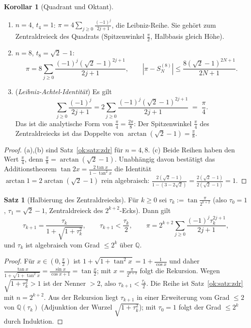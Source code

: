 \documentclass[a4paper,12pt,twoside]{report}
\theoremstyle{definition}
\newtheorem{satz}{Satz}
\newtheorem{korollar}{Korollar}
\begin{document}
\begin{korollar}[Quadrant und Oktant]\label{ok:kor:vier-acht}
\begin{enumerate}[label=(\alph*)]
\item $n=4$, $t_4=1$: $\pi=4\sum_{j\ge0}\frac{(-1)^j}{2j+1}$, die Leibniz-Reihe. Sie gehört zum Zentraldreieck des Quadrats (Spitzenwinkel $\frac\pi2$, Halbbasis gleich Höhe).
\item $n=8$, $t_8=\sqrt2-1$: 
\[
\pi=8\sum_{j\ge0}\frac{(-1)^j(\sqrt2-1)^{2j+1}}{2j+1},\qquad |\pi-S_N^{(8)}|\le\frac{8(\sqrt2-1)^{2N+1}}{2N+1}.
\]
\item (\emph{Leibniz-Achtel-Identität}) Es gilt
\[
\sum_{j\ge0}\frac{(-1)^j}{2j+1}=2\sum_{j\ge0}\frac{(-1)^j(\sqrt2-1)^{2j+1}}{2j+1}\;=\;\frac\pi4 .
\]
Das ist die analytische Form von $\frac\pi4=\frac{2\pi}8$: Der Spitzenwinkel $\frac\pi4$ des Zentraldreiecks ist das Doppelte von $\arctan(\sqrt2-1)=\frac\pi8$.
\end{enumerate}
\end{korollar}

\begin{proof}
(a),(b) sind Satz~\ref{ok:satz:zdr} für $n=4,8$. (c) Beide Reihen haben den Wert $\frac\pi4$, denn $\frac\pi8=\arctan(\sqrt2-1)$. Unabhängig davon bestätigt das Additionstheorem $\tan2x=\frac{2\tan x}{1-\tan^2x}$ die Identität $\arctan1=2\arctan(\sqrt2-1)$ rein algebraisch: $\frac{2(\sqrt2-1)}{1-(3-2\sqrt2)}=\frac{2(\sqrt2-1)}{2(\sqrt2-1)}=1$.
\end{proof}

\begin{satz}[Halbierung des Zentraldreiecks]\label{ok:satz:halb}
Für $k\ge0$ sei $\tau_k:=\tan\frac\pi{2^{k+2}}$ (also $\tau_0=1$, $\tau_1=\sqrt2-1$, Zentraldreieck des $2^{k+2}$-Ecks). Dann gilt
\[
\tau_{k+1}=\frac{\tau_k}{1+\sqrt{1+\tau_k^2}},\qquad\tau_{k+1}<\frac{\tau_k}2,\qquad
\pi=2^{k+2}\sum_{j\ge0}\frac{(-1)^j\tau_k^{2j+1}}{2j+1},
\]
und $\tau_k$ ist algebraisch vom Grad $\le2^k$ über $\mathbb{Q}$.
\end{satz}

\begin{proof}
Für $x\in(0,\frac\pi2)$ ist $1+\sqrt{1+\tan^2x}=1+\frac1{\cos x}$ und daher $\frac{\tan x}{1+\sqrt{1+\tan^2x}}=\frac{\sin x}{\cos x+1}=\tan\frac x2$; mit $x=\frac\pi{2^{k+2}}$ folgt die Rekursion. Wegen $\sqrt{1+\tau_k^2}>1$ ist der Nenner $>2$, also $\tau_{k+1}<\frac{\tau_k}2$. Die Reihe ist Satz~\ref{ok:satz:zdr} mit $n=2^{k+2}$. Aus der Rekursion liegt $\tau_{k+1}$ in einer Erweiterung vom Grad $\le2$ von $\mathbb{Q}(\tau_k)$ (Adjunktion der Wurzel $\sqrt{1+\tau_k^2}$); mit $\tau_0=1$ folgt der Grad $\le2^k$ durch Induktion.
\end{proof}
\end{document}
